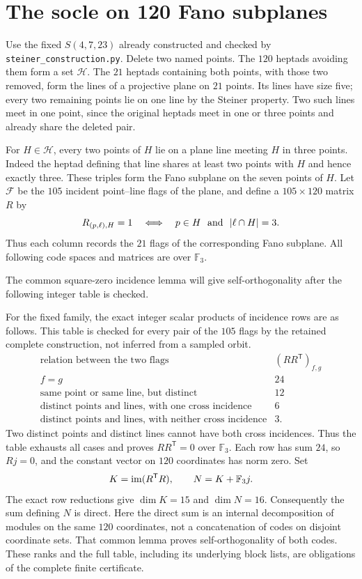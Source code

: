 \section{The socle on 120 Fano subplanes}
Use the fixed $S(4,7,23)$ already constructed and checked by
\texttt{steiner\_construction.py}. Delete two named points. The $120$ heptads
avoiding them form a set $\mathcal H$. The $21$ heptads containing both
points, with those two removed, form the lines of a projective plane on
$21$ points. Its lines have size five; every two remaining points lie on
one line by the Steiner property. Two such lines meet in one point, since
the original heptads meet in one or three points and already share the
deleted pair.

For $H\in\mathcal H$, every two points of $H$ lie on a plane line meeting
$H$ in three points. Indeed the heptad defining that line shares at least
two points with $H$ and hence exactly three. These triples form the Fano
subplane on the seven points of $H$. Let $\mathcal F$ be the $105$ incident
point--line flags of the plane, and define a $105\times120$ matrix $R$ by
\[
 R_{(p,\ell),H}=1\quad\Longleftrightarrow\quad
 p\in H\ \hbox{ and }\ |\ell\cap H|=3.
\]
Thus each column records the $21$ flags of the corresponding Fano subplane.
All following code spaces and matrices are over $\mathbb F_3$.

The common square-zero incidence lemma \cite[Lemma~6.1]{U} will give self-orthogonality after the following integer table is checked.

For the fixed family, the exact integer scalar products of incidence rows
are as follows. This table is checked for every pair of the $105$ flags by
the retained complete construction, not inferred from a sampled orbit.
\[
\begin{array}{l|r}
\text{relation between the two flags}&(RR^{\mathsf T})_{f,g}\\ \hline
f=g&24\\
\text{same point or same line, but distinct}&12\\
\text{distinct points and lines, with one cross incidence}&6\\
\text{distinct points and lines, with neither cross incidence}&3.
\end{array}
\]
Two distinct points and distinct lines cannot have both cross incidences.
Thus the table exhausts all cases and proves $RR^{\mathsf T}=0$ over
$\mathbb F_3$. Each row has sum $24$, so $Rj=0$, and the constant vector on
$120$ coordinates has norm zero. Set
\[
 K=\operatorname{im}(R^{\mathsf T}R),\qquad N=K+\mathbb F_3j.
\]
The exact row reductions give $\dim K=15$ and $\dim N=16$.
Consequently the sum defining $N$ is direct. Here the direct sum is an
internal decomposition of modules on the same $120$ coordinates, not a
concatenation of codes on disjoint coordinate sets. That common lemma proves
self-orthogonality of both codes. These ranks and the full table, including
its underlying block lists, are obligations of the complete finite certificate.

